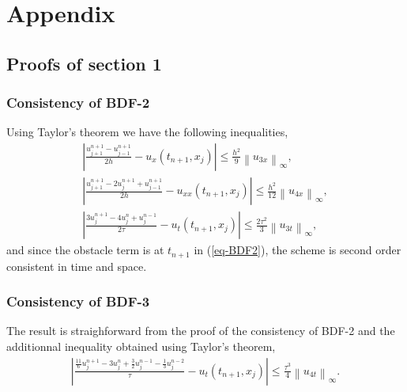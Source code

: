 \documentclass[12pt,a4paper]{article}
\newcommand{\ninf}[1]{\left\| {#1} \right\|_\infty}
\newcommand{\abs}[1]{\left\vert {#1} \right\vert}
\begin{document}

\newpage
\section{Appendix}

	\subsection{Proofs of section 1}
	
		\subsubsection{Consistency of BDF-2}

Using Taylor's theorem we have the following inequalities,
\begin{align*}
\abs{ \frac{u_{j+1}^{n+1}-u_{j-1}^{n+1}}{2h} - u_x(t_{n+1},x_j) } \leq \frac{h^2}{9} \ninf{u_{3x}}, \\
\abs{ \frac{u_{j+1}^{n+1}-2u_{j}^{n+1}+u_{j-1}^{n+1}}{2h} - u_{xx}(t_{n+1},x_j) } \leq \frac{h^2}{12} \ninf{u_{4x}}, \\
\abs{ \frac{3u_{j}^{n+1} - 4u_{j}^{n} + u_{j}^{n-1}}{2 \tau} - u_t(t_{n+1},x_j) } \leq \frac{2 \tau^2}{3} \ninf{u_{3t}},
\end{align*}
and since the obstacle term is at $t_{n+1}$ in (\ref{eq-BDF2}), the scheme is second order consistent in time and space.

		\subsubsection{Consistency of BDF-3}

The result is straighforward from the proof of the consistency of BDF-2 and the additionnal inequality obtained using Taylor's theorem,
\begin{align*}
\abs{ \frac{\frac{11}{6} u_j^{n+1} - 3 u_j^n + \frac{3}{2} u_j^{n-1} - \frac{1}{3} u_j^{n-2}}{\tau} - u_t(t_{n+1},x_j) } \leq \frac{\tau^3}{4} \ninf{u_{4t}}.
\end{align*}


\newpage


\end{document}
